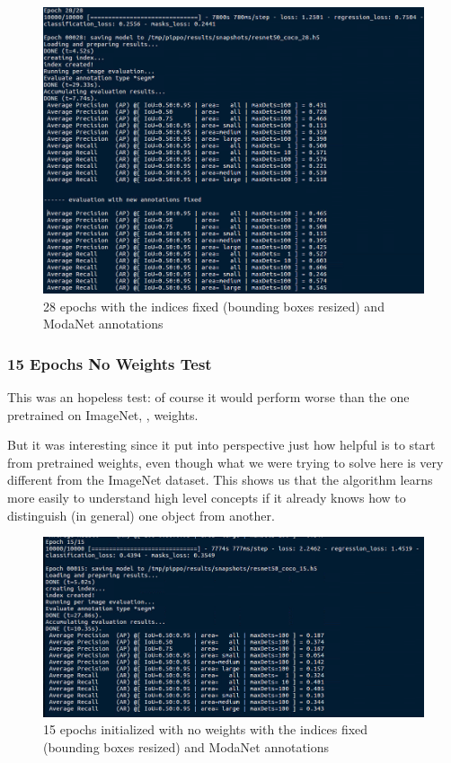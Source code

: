 \begin{figure}[H]
	\centering
	\includegraphics[width=\linewidth]{figures/train/28fixedindices}
	\caption{28 epochs with the indices fixed (bounding boxes resized) and ModaNet annotations}
	\label{f:train-28fixedindices}
\end{figure}



\subsubsection{15 Epochs No Weights Test}

This was an hopeless test: of course it would perform worse than the one pretrained on ImageNet, , weights.

But it was interesting since it put into perspective just how helpful is to start from pretrained weights, even though what we were trying to solve here is very different from the ImageNet dataset. This shows us that the algorithm learns more easily to understand high level concepts if it already knows how to distinguish (in general) one object from another.

\begin{figure}[H]
	\centering
	\includegraphics[width=\linewidth]{figures/train/15noweights}
	\caption{15 epochs initialized with no weights with the indices fixed (bounding boxes resized) and ModaNet annotations}
	\label{f:train-15noweights}
\end{figure}

